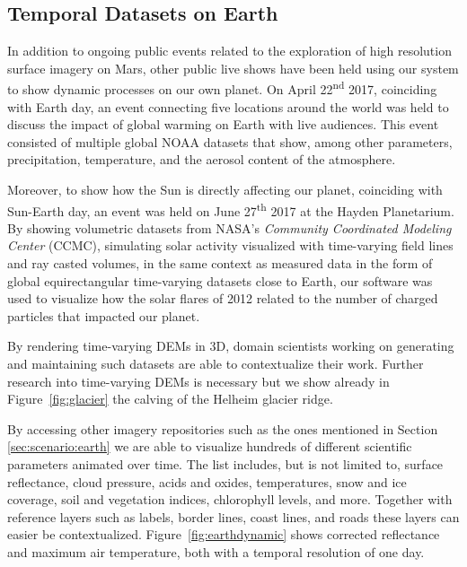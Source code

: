 \documentclass[journal]{vgtc}                %
\newcommand{\fig}[1]{Figure~\ref{fig:#1}}
\begin{document}
\subsection{Temporal Datasets on Earth}

In addition to ongoing public events related to the exploration of high resolution surface imagery on Mars, other public live shows have been held using our system to show dynamic processes on our own planet.
On April 22\textsuperscript{nd} 2017, coinciding with Earth day, an event connecting five locations around the world was held to discuss the impact of global warming on Earth with live audiences.
This event consisted of multiple global NOAA datasets that show, among other parameters, precipitation, temperature, and the aerosol content of the atmosphere.

Moreover, to show how the Sun is directly affecting our planet, coinciding with Sun-Earth day, an event was held on June 27\textsuperscript{th} 2017 at the Hayden Planetarium.
By showing volumetric datasets from NASA's \emph{Community Coordinated Modeling Center} (CCMC), simulating solar activity visualized with time-varying field lines and ray casted volumes, in the same context as measured data in the form of global equirectangular time-varying datasets close to Earth, our software was used to visualize how the solar flares of 2012 related to the number of charged particles that impacted our planet.


By rendering time-varying DEMs in 3D, domain scientists working on generating and maintaining such datasets are able to contextualize their work. Further research into time-varying DEMs is necessary but we show already in \fig{glacier} the calving of the Helheim glacier ridge.

By accessing other imagery repositories such as the ones mentioned in Section \ref{sec:scenario:earth} we are able to visualize hundreds of different scientific parameters animated over time. The list includes, but is not limited to, surface reflectance, cloud pressure, acids and oxides, temperatures, snow and ice coverage, soil and vegetation indices, chlorophyll levels, and more. Together with reference layers such as labels, border lines, coast lines, and roads these layers can easier be contextualized.
\fig{earthdynamic} shows corrected reflectance and maximum air temperature, both with a temporal resolution of one day.
\end{document}
